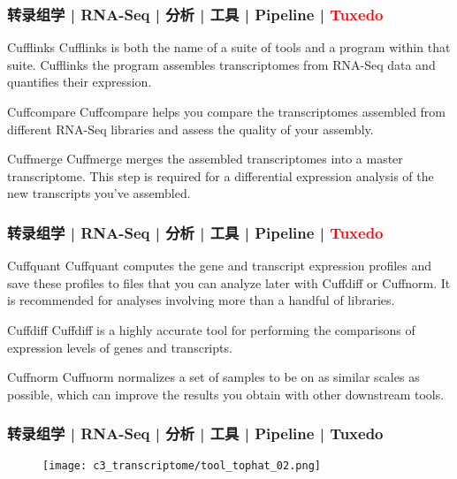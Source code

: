 \begin{frame}
  \frametitle{转录组学 | RNA-Seq | 分析 | 工具 | Pipeline | \textcolor{red}{Tuxedo}}
  \begin{block}{Cufflinks}
    Cufflinks is both the name of a suite of tools and a program within that suite. Cufflinks the program assembles transcriptomes from RNA-Seq data and quantifies their expression.
  \end{block}
  \pause
  \begin{block}{Cuffcompare}
    Cuffcompare helps you compare the transcriptomes assembled from different RNA-Seq libraries and assess the quality of your assembly.
  \end{block}
  \pause
  \begin{block}{Cuffmerge}
    Cuffmerge merges the assembled transcriptomes into a master transcriptome. This step is required for a differential expression analysis of the new transcripts you've assembled. 
  \end{block}
\end{frame}

\begin{frame}
  \frametitle{转录组学 | RNA-Seq | 分析 | 工具 | Pipeline | \textcolor{red}{Tuxedo}}
  \begin{block}{Cuffquant}
    Cuffquant computes the gene and transcript expression profiles and save these profiles to files that you can analyze later with Cuffdiff or Cuffnorm. It is recommended for analyses involving more than a handful of libraries.
  \end{block}
  \pause
  \begin{block}{Cuffdiff}
    Cuffdiff is a highly accurate tool for performing the comparisons of expression levels of genes and transcripts.
  \end{block}
  \pause
  \begin{block}{Cuffnorm}
    Cuffnorm normalizes a set of samples to be on as similar scales as possible, which can improve the results you obtain with other downstream tools.
  \end{block}
\end{frame}

\begin{frame}
  \frametitle{转录组学 | RNA-Seq | 分析 | 工具 | Pipeline | Tuxedo}
  \begin{figure}
    \centering
    \texttt{[image: c3\_transcriptome/tool\_tophat\_02.png]}
  \end{figure}
\end{frame}

